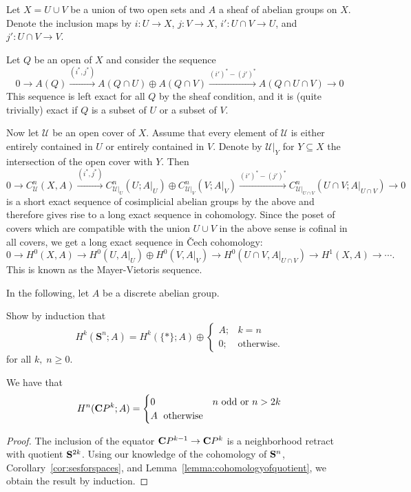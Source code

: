 \documentclass[a4paper,openany]{scrbook}
\begin{document}
Let $X=U \cup V$ be a union of two open sets and $A$ a sheaf of abelian groups on $X$. Denote the inclusion maps by $i\colon U \to X$, $j\colon V \to X$, $i'\colon U \cap V \to U$, and $j'\colon U \cap V \to V$.

Let $Q$ be an open of $X$ and consider the sequence
\[
0 \to A(Q) \xrightarrow{(i^*,j^*)} A(Q \cap U) \oplus A(Q \cap V) \xrightarrow{(i')^*-(j')^*} A(Q \cap U \cap V) \to 0
\]
This sequence is left exact for all $Q$ by the sheaf condition, and it is (quite trivially) exact if $Q$ is a subset of $U$ or a subset of $V$.

Now let $\mathcal U$ be an open cover of $X$. Assume that every element of $\mathcal U$ is either entirely contained in $U$ or entirely contained in $V$. Denote by $\mathcal U|_Y$ for $Y \subseteq X$ the intersection of the open cover with $Y$. Then
\[
0 \to C^n_{\mathcal U}(X,A) \xrightarrow{(i^*,j^*)} C^n_{\mathcal U|_U}(U;A|_U) \oplus C^n_{\mathcal U|_V}(V;A|_V) \xrightarrow{(i')^*-(j')^*} C^n_{\mathcal U|_{U \cap V}}(U \cap V;A|_{U \cap V})\to 0
\]
is a short exact sequence of cosimplicial abelian groups by the above and therefore gives rise to a long exact sequence in cohomology. Since the poset of covers which are compatible with the union $U \cup V$ in the above sense is cofinal in all covers, we get a long exact sequence in \v Cech cohomology:
\[
0 \to H^0(X,A) \to H^0(U,A|_U) \oplus H^0(V,A|_V) \to H^0(U\cap V,A|_{U \cap V}) \to H^1(X,A) \to \cdots.
\]
This is known as the Mayer-Vietoris sequence.

In the following, let $A$ be a discrete abelian group.
\begin{exer}\label{exer:cohomologyofspheres}
Show by induction that 
\[
H^k(\mathbf S^n;A) = H^k(\{*\};A) \oplus \begin{cases} A;& k=n\\ 0;& \text{otherwise.}\end{cases}
\]
for all $k,\;n \geq 0$.
\end{exer}

\begin{corollary}\label{cor:additivecohomologyofPn}
We have that
\[
H^n(\CP^k;A) = \begin{cases} 0\; & n \text{ odd or } n>2k\\ A\; \text{ otherwise}\end{cases}
\]
\end{corollary}
\begin{proof}
The inclusion of the equator $\CP^{k-1} \to \CP^k$ is a neighborhood retract with quotient $\S^{2k}$. Using our knowledge of the cohomology of $\S^n$, Corollary~\ref{cor:sesforspaces}, and Lemma~\ref{lemma:cohomologyofquotient}, we obtain the result by induction.
\end{proof}
\end{document}
